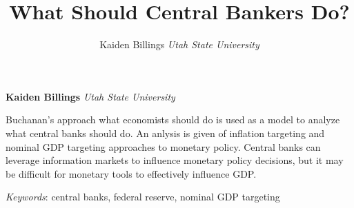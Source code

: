 \documentclass[11pt,]{article}
\title{What Should Central Bankers Do?  }
\author{\Large Kaiden Billings\vspace{0.05in} \newline\normalsize\emph{Utah State University}  }
\date{}
\newcommand*{\authorfont}{\fontfamily{phv}\selectfont}
\renewenvironment{abstract}
 {{%
    \setlength{\leftmargin}{0mm}
    \setlength{\rightmargin}{\leftmargin}%
  }%
  \relax}
 {\endlist}
\begin{document}
	
%

{%
\setlength{\parindent}{0pt}
\thispagestyle{plain}
{\fontsize{18}{20}\selectfont\raggedright 
\maketitle  %

}

{
   \vskip 13.5pt\relax \normalsize\fontsize{11}{12} 
\textbf{\authorfont Kaiden Billings} \hskip 15pt \emph{\small Utah State University}   

}

}







\begin{abstract}

    \hbox{\vrule height .2pt width 39.14pc}

    \vskip 8.5pt %

\noindent Buchanan's approach what economists should do is used as a model to
analyze what central banks should do. An anlysis is given of inflation
targeting and nominal GDP targeting approaches to monetary policy.
Central banks can leverage information markets to influence monetary
policy decisions, but it may be difficult for monetary tools to
effectively influence GDP.


\vskip 8.5pt \noindent \emph{Keywords}: central banks, federal reserve, nominal GDP targeting \par

    \hbox{\vrule height .2pt width 39.14pc}



\end{abstract}


\vskip 6.5pt

\noindent \doublespacing \begin{quote}
\end{quote}
\end{document}
